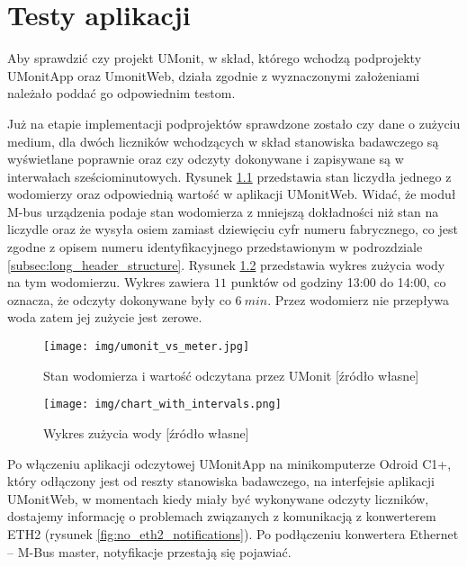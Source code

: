 \chapter{Testy aplikacji} %
\label{cha:testy}

Aby sprawdzić czy projekt UMonit, w skład, którego wchodzą podprojekty UMonitApp oraz UmonitWeb, działa zgodnie z wyznaczonymi założeniami należało poddać go odpowiednim testom.

Już na etapie implementacji podprojektów sprawdzone zostało czy dane o zużyciu medium, dla dwóch liczników wchodzących w skład stanowiska badawczego są wyświetlane poprawnie oraz czy odczyty dokonywane i zapisywane są w interwałach sześciominutowych.
Rysunek \ref{fig:meter_vs_umonitweb} przedstawia stan liczydła jednego z wodomierzy oraz odpowiednią wartość w aplikacji UMonitWeb.
Widać, że moduł M-bus urządzenia podaje stan wodomierza z mniejszą dokładności niż stan na liczydle oraz że wysyła osiem zamiast dziewięciu cyfr numeru fabrycznego,
co jest zgodne z opisem numeru identyfikacyjnego przedstawionym w podrozdziale \ref{subsec:long_header_structure}.
Rysunek \ref{fig:chart_with_intervals} przedstawia wykres zużycia wody na tym wodomierzu.
Wykres zawiera $ 11 $ punktów od godziny 13:00 do 14:00, co oznacza, że odczyty dokonywane były co $ 6\ min$.
Przez wodomierz nie przepływa woda zatem jej zużycie jest zerowe.

\begin{figure}[ht]
	\centering
	\texttt{[image: img/umonit\_vs\_meter.jpg]}
	\caption[Stan wodomierza i wartość odczytana przez UMonit]{Stan wodomierza i wartość odczytana przez UMonit [źródło własne]}
	\label{fig:meter_vs_umonitweb}
\end{figure}

\begin{figure}[ht]
	\centering
	\texttt{[image: img/chart\_with\_intervals.png]}
	\caption[Wykres zużycia wody]{Wykres zużycia wody [źródło własne]}
	\label{fig:chart_with_intervals}
\end{figure}

Po włączeniu aplikacji odczytowej UMonitApp na minikomputerze Odroid C1+, który odłączony jest od reszty stanowiska badawczego, na interfejsie aplikacji UMonitWeb, w momentach kiedy miały być wykonywane odczyty liczników, dostajemy informację o problemach związanych z komunikacją z konwerterem ETH2 (rysunek \ref{fig:no_eth2_notifications}).
Po podłączeniu konwertera Ethernet -- M-Bus master, notyfikacje przestają się pojawiać.

